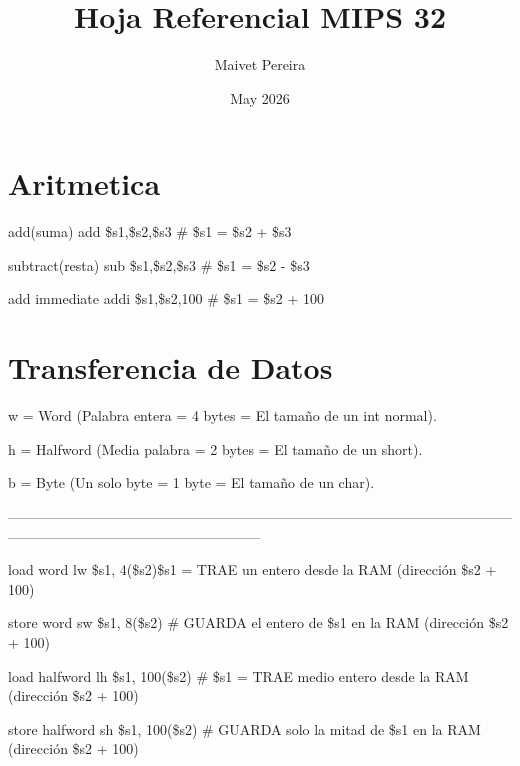 \documentclass[24pt,letterpaper]{article}
\title{Hoja Referencial MIPS 32}
\author{Maivet Pereira}
\date{May 2026}
\begin{document}
\maketitle

\section{Aritmetica}
add(suma) \hspace{0.60cm} add \$s1,\$s2,\$s3  \hspace{0,60cm} \# \$s1 = \$s2 + \$s3

subtract(resta) \hspace{0.60cm} sub \$s1,\$s2,\$s3  \hspace{0,60cm} \# \$s1 = \$s2 - \$s3

add immediate \hspace{0.60cm} addi \$s1,\$s2,100  \hspace{0.60cm} \# \$s1 = \$s2 + 100

\section{Transferencia de Datos}
w = Word (Palabra entera = 4 bytes = El tamaño de un int normal).

h = Halfword (Media palabra = 2 bytes = El tamaño de un short).

b = Byte (Un solo byte = 1 byte = El tamaño de un char).

------------------------------------------------------------------------------------------------------------------------------------------------------------------

load word \hspace{0.60cm} lw \$s1, 4(\$s2)\$s1 = TRAE un entero desde la RAM (dirección \$s2 + 100)

store word \hspace{0.60cm} sw \$s1, 8(\$s2) \hspace{0.60cm} \# GUARDA el entero de \$s1 en la RAM (dirección \$s2 + 100)

load halfword \hspace{0.60cm} lh \$s1, 100(\$s2) \hspace{0.60cm} \# \$s1 = TRAE medio entero  desde la RAM (dirección \$s2 + 100)

store halfword \hspace{0.60cm} sh \$s1, 100(\$s2) \hspace{0.60cm} \# GUARDA solo la mitad de \$s1 en la RAM (dirección \$s2 + 100)
\end{document}
